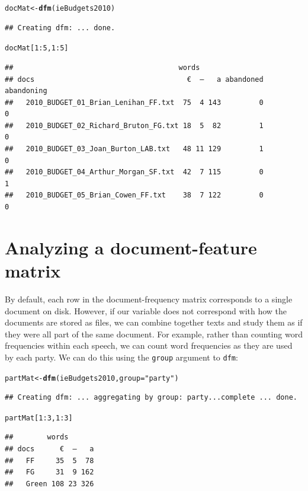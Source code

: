 \documentclass[11pt]{article}\usepackage[]{graphicx}\usepackage[]{color}
\makeatletter
\newcommand{\hlnum}[1]{\textcolor[rgb]{0.686,0.059,0.569}{#1}}%
\newcommand{\hlstr}[1]{\textcolor[rgb]{0.192,0.494,0.8}{#1}}%
\newcommand{\hlopt}[1]{\textcolor[rgb]{0,0,0}{#1}}%
\newcommand{\hlstd}[1]{\textcolor[rgb]{0.345,0.345,0.345}{#1}}%
\newcommand{\hlkwb}[1]{\textcolor[rgb]{0.69,0.353,0.396}{#1}}%
\newcommand{\hlkwc}[1]{\textcolor[rgb]{0.333,0.667,0.333}{#1}}%
\newcommand{\hlkwd}[1]{\textcolor[rgb]{0.737,0.353,0.396}{\textbf{#1}}}%
\newenvironment{kframe}{%
 \def\at@end@of@kframe{}%
 \ifinner\ifhmode%
  \def\at@end@of@kframe{\end{minipage}}%
  \begin{minipage}{\columnwidth}%
 \fi\fi%
 \def\FrameCommand##1{\hskip\@totalleftmargin \hskip-\fboxsep
 \colorbox{shadecolor}{##1}\hskip-\fboxsep
     \hskip-\linewidth \hskip-\@totalleftmargin \hskip\columnwidth}%
 \MakeFramed {\advance\hsize-\width
   \@totalleftmargin\z@ \linewidth\hsize
   \@setminipage}}%
 {\par\unskip\endMakeFramed%
 \at@end@of@kframe}
\newenvironment{knitrout}{}{} %
\makeatother
\begin{document}
\begin{knitrout}\footnotesize
{}\color{fgcolor}\begin{kframe}
\begin{alltt}
\hlstd{docMat} \hlkwb{<-} \hlkwd{dfm}\hlstd{(ieBudgets2010)}
\end{alltt}
\begin{verbatim}
## Creating dfm: ... done.
\end{verbatim}
\begin{alltt}
\hlstd{docMat[}\hlnum{1}\hlopt{:}\hlnum{5}\hlstd{,}\hlnum{1}\hlopt{:}\hlnum{5}\hlstd{]}
\end{alltt}
\begin{verbatim}
##                                       words
## docs                                    €  —   a abandoned abandoning
##   2010_BUDGET_01_Brian_Lenihan_FF.txt  75  4 143         0          0
##   2010_BUDGET_02_Richard_Bruton_FG.txt 18  5  82         1          0
##   2010_BUDGET_03_Joan_Burton_LAB.txt   48 11 129         1          0
##   2010_BUDGET_04_Arthur_Morgan_SF.txt  42  7 115         0          1
##   2010_BUDGET_05_Brian_Cowen_FF.txt    38  7 122         0          0
\end{verbatim}
\end{kframe}
\end{knitrout}

\section{Analyzing a document-feature matrix}

By default, each row in the document-frequency matrix corresponds to a single document on disk. However, if our variable does not correspond with how the documents are stored as files, we can combine together texts and study them as if they were all part of the same document. For example, rather than counting word frequencies within each speech, we can count word frequencies as they are used by each party. We can do this using the \texttt{group} argument to \texttt{dfm}:

\begin{knitrout}\footnotesize
{}\color{fgcolor}\begin{kframe}
\begin{alltt}
\hlstd{partMat} \hlkwb{<-} \hlkwd{dfm}\hlstd{(ieBudgets2010,} \hlkwc{group}\hlstd{=}\hlstr{"party"}\hlstd{)}
\end{alltt}
\begin{verbatim}
## Creating dfm: ... aggregating by group: party...complete ... done.
\end{verbatim}
\begin{alltt}
\hlstd{partMat[}\hlnum{1}\hlopt{:}\hlnum{3}\hlstd{,}\hlnum{1}\hlopt{:}\hlnum{3}\hlstd{]}
\end{alltt}
\begin{verbatim}
##        words
## docs      €  —   a
##   FF     35  5  78
##   FG     31  9 162
##   Green 108 23 326
\end{verbatim}
\end{kframe}
\end{knitrout}
\end{document}

